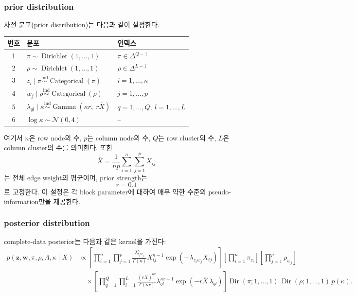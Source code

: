 \documentclass[A4paper,11pt]{article}
\begin{document}
\subsubsection{prior distribution}

사전 분포(prior distribution)는 다음과 같이 설정한다.

\begin{table}[H]
\centering
\begin{tabular}{c|l|l}
\hline
\textbf{번호} & \textbf{분포} & \textbf{인덱스} \\ \hline

1 &
$\displaystyle \pi \sim \operatorname{Dirichlet}(1,\ldots,1)$ &
$\pi \in \Delta^{Q-1}$ \\ \hline

2 &
$\displaystyle \rho \sim \operatorname{Dirichlet}(1,\ldots,1)$ &
$\rho \in \Delta^{L-1}$ \\ \hline

3 &
$\displaystyle z_i \mid \pi \overset{\text{ind}}{\sim} \operatorname{Categorical}(\pi)$ &
$i=1,\ldots,n$ \\ \hline

4 &
$\displaystyle w_j \mid \rho \overset{\text{ind}}{\sim} \operatorname{Categorical}(\rho)$ &
$j=1,\ldots,p$ \\ \hline

5 &
$\displaystyle \lambda_{ql}\mid \kappa \overset{\text{ind}}{\sim}
\operatorname{Gamma}(\kappa r,\; r\bar X)$ &
$q=1,\ldots,Q;\ l=1,\ldots,L$ \\ \hline

6 &
$\displaystyle \log \kappa \sim \mathcal{N}(0,4)$ &
-- \\ \hline

\end{tabular}
\end{table}

여기서 $n$은 row node의 수, $p$는 column node의 수, $Q$는 row cluster의 수, $L$은 column cluster의 수를 의미한다. 또한
\[
\bar X = \frac{1}{np}\sum_{i=1}^{n}\sum_{j=1}^{p}X_{ij}
\]
는 전체 edge weight의 평균이며, prior strength는
\[
r = 0.1
\]
로 고정한다. 이 설정은 각 block parameter에 대하여 매우 약한 수준의 pseudo-information만을 제공한다.

\subsubsection{posterior distribution}

complete-data posterior는 다음과 같은 kernel을 가진다:
\begin{align*}
p(\mathbf{z},\mathbf{w},\pi,\rho,\Lambda,\kappa \mid X)
&\propto
\left[
\prod_{i=1}^{n}\prod_{j=1}^{p}
\frac{\lambda_{z_iw_j}^{\kappa}}{\Gamma(\kappa)}
X_{ij}^{\kappa-1}
\exp(-\lambda_{z_iw_j}X_{ij})
\right]
\left[
\prod_{i=1}^{n}\pi_{z_i}
\right]
\left[
\prod_{j=1}^{p}\rho_{w_j}
\right] \\
&\quad\times
\left[
\prod_{q=1}^{Q}\prod_{l=1}^{L}
\frac{(r\bar X)^{\kappa r}}{\Gamma(\kappa r)}
\lambda_{ql}^{\kappa r-1}
\exp(-r\bar X\,\lambda_{ql})
\right]
\operatorname{Dir}(\pi;1,\ldots,1)\,
\operatorname{Dir}(\rho;1,\ldots,1)\,
p(\kappa).
\end{align*}
\end{document}
